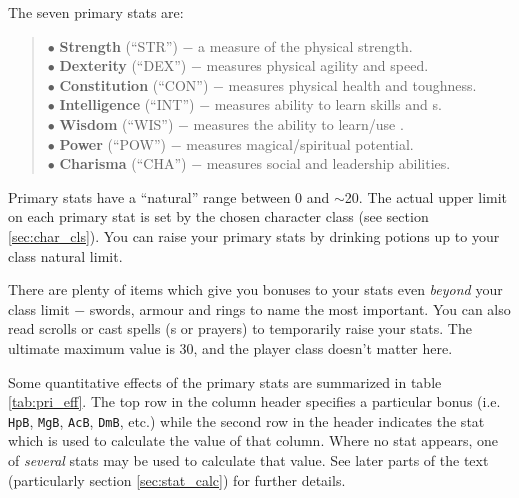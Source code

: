 The seven primary stats are:
{\small
\begin{quote}
$\bullet$ {\bf Strength} (``STR'') $-$
a measure of the physical strength. \\
$\bullet$ {\bf Dexterity} (``DEX'') $-$
measures physical agility and speed. \\
$\bullet$ {\bf Constitution} (``CON'') $-$
measures physical health and toughness. \\
$\bullet$ {\bf Intelligence} (``INT'') $-$
measures ability to learn skills and \incantation s. \\
$\bullet$ {\bf Wisdom} (``WIS'') $-$
measures the ability to learn/use \divinemagic . \\
$\bullet$ {\bf Power} (``POW'') $-$
measures magical/spiritual potential. \\
$\bullet$ {\bf Charisma} (``CHA'') $-$
measures social and leadership abilities.
\end{quote}
}
Primary stats have a ``natural'' range
between 0 and $\sim$20. The actual upper limit on each primary stat is
set by the chosen character class (see section \ref{sec:char_cls}). You
can raise your primary stats by drinking potions up to
your class natural limit.

There are plenty of items which give you bonuses to your
stats even {\em beyond} your class limit $-$ swords,
armour and rings to
name the most important. You can also read scrolls or cast
spells (\incantation s
or prayers) to temporarily raise your stats.  The ultimate maximum value is 30,
and the player class doesn't matter here.

Some quantitative effects of the primary stats are summarized in table
\ref{tab:pri_eff}. The top row in the column header specifies a particular
bonus (i.e. {\tt HpB}, {\tt MgB}, {\tt AcB}, {\tt DmB}, etc.) while the second row
in the header indicates the stat which is used to calculate the value of
that column. Where no stat appears, one of {\em several} stats may be
used to calculate that value. See later parts of the text (particularly
section \ref{sec:stat_calc}) for further details.

